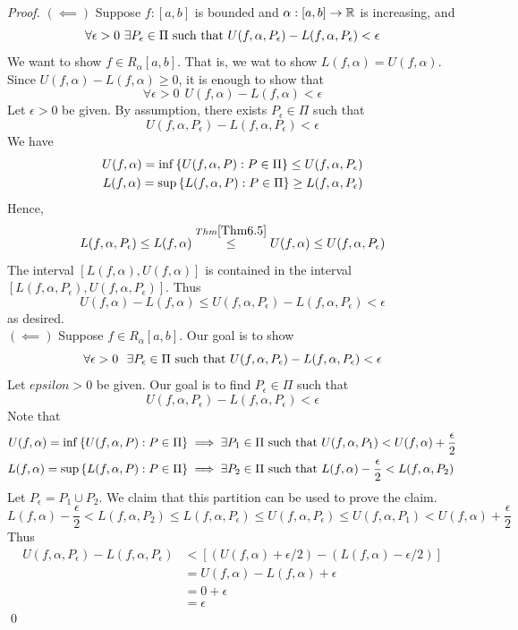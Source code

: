 \begin{proof}
    $(\impliedby)$ Suppose $f: [a,b]$ is bounded and $\alpha: [a,b] \to \mathbb{R}$ is increasing, and
    $$
    \forall \epsilon > 0 ~\exists P_\epsilon \in \Pi \text{ such that } U(f, \alpha, P_\epsilon) - L(f, \alpha, P_\epsilon) < \epsilon
    $$
    We want to show $f \in R_\alpha [a,b].$ That is, we wat to show $L(f, \alpha) = U(f, \alpha)$. Since $U(f, \alpha) - L(f, \alpha) \geq 0$, it is enough to show that
    $$
        \forall \epsilon > 0 ~~U(f, \alpha) - L(f, \alpha) < \epsilon
    $$
    Let $\epsilon > 0$ be given. By assumption, there exists $P_\epsilon \in \Pi$ such that
    $$
        U(f, \alpha, P_\epsilon) - L(f, \alpha, P_\epsilon) < \epsilon
    $$
    We have
    \begin{align*}
        U(f, \alpha) = \inf \left\{U(f, \alpha, P) : P \in \Pi\right\} \leq U(f, \alpha, P_\epsilon) \\
        L(f, \alpha) = \sup \left\{L(f, \alpha, P) : P \in \Pi\right\} \geq L(f, \alpha, P_\epsilon)
    \end{align*}
    Hence,
    $$
        L(f, \alpha , P_\epsilon) \leq L(f, \alpha) \overset{Thm \ref{Thm6.5}}{\leq} U(f, \alpha) \leq U(f, \alpha, P_\epsilon)
    $$
    The interval $[L(f, \alpha), U(f, \alpha)]$ is contained in the interval $[L(f, \alpha, P_\epsilon), U(f, \alpha, P_\epsilon)]$. Thus
    $$
        U(f, \alpha) - L(f, \alpha) \leq U(f, \alpha, P_\epsilon) - L(f, \alpha, P_\epsilon) < \epsilon
    $$
    as desired. \\

    $(\impliedby)$ Suppose $f\in R_\alpha [a,b].$ Our goal is to show 
    $$\forall \epsilon > 0 ~~\exists P_\epsilon \in \Pi \text{ such that } U(f, \alpha, P_\epsilon) - L(f, \alpha, P_\epsilon) < \epsilon$$
    Let $epsilon > 0$ be given. Our goal is to find $P_\epsilon \in \Pi$ such that 
    $$U(f, \alpha, P_\epsilon) - L(f, \alpha, P_\epsilon) < \epsilon$$
    Note that 
    \begin{align*}
        U(f, \alpha) = \inf\left\{U(f, \alpha, P) : P \in \Pi\right\} &\implies \exists P_1 \in \Pi \text{ such that } U(f, \alpha, P_1) < U(f, \alpha) + \frac{\epsilon}{2} \\
        L(f, \alpha) = \sup\left\{L(f, \alpha, P) : P \in \Pi\right\} &\implies \exists P_2 \in \Pi \text{ such that } L(f, \alpha) - \frac{\epsilon}{2}< L(f, \alpha, P_2)
    \end{align*}
    Let $P_\epsilon = P_1 \cup P_2.$ We claim that this partition can be used to prove the claim.
    $$L(f, \alpha) - \frac{\epsilon}{2} < L(f, \alpha, P_2) \leq L(f, \alpha, P_\epsilon) \leq U(f, \alpha, P_\epsilon) \leq U(f, \alpha, P_1) < U(f, \alpha) + \frac{\epsilon}{2}$$
    Thus 
    \begin{align*}
        U(f, \alpha, P_\epsilon) - L(f, \alpha, P_\epsilon) &< \left[\left(U(f, \alpha) + \epsilon/2\right)-\left(L(f, \alpha) -\epsilon / 2\right)\right] \\
        &= U(f, \alpha) - L(f, \alpha) + \epsilon \\
        &= 0 + \epsilon \\
        &= \epsilon
    \end{align*}
    \qed
\end{proof}

